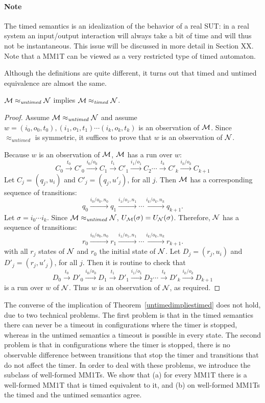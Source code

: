 \paragraph{Note}
The timed semantics is an idealization of the behavior of a real SUT: in a real system an input/output
interaction will always take a bit of time and will thus not be instantaneous.
This issue will be discussed in more detail in Section XX.
Note that a MM1T can be viewed as a very restricted type of timed automaton.

Although the definitions are quite different, it turns out that timed and untimed equivalence are almost the same.

\begin{theorem}
\label{untimedimpliestimed}
${\cal M} \approx_{\mathit{untimed}} {\cal N}$
implies
${\cal M} \approx_{\mathit{timed}} {\cal N}$.
\end{theorem}
\begin{proof}
Assume ${\cal M} \approx_{\mathit{untimed}} {\cal N}$ and assume
$w = (i_0, o_0, t_0), (i_1, o_1, t_1) \cdots (i_k, o_k, t_k)$ is an observation of ${\cal M}$.
Since $\approx_{\mathit{untimed}}$ is symmetric, it suffices to prove that $w$ is an observation of ${\cal N}$.

Because $w$ is an observation of ${\cal M}$, ${\cal M}$ has a run over $w$:
\[
C_0 \xrightarrow{t_0} C'_0 \xrightarrow{i_0/o_0} C_1 \xrightarrow{t_1} C'_1 \xrightarrow{i_1/o_1} C_2 \cdots
\xrightarrow{t_k} C'_k \xrightarrow{i_k/o_k} C_{k+1}
\]
Let $C_j = (q_j, u_i)$ and $C'_j = (q_j, u'_j)$, for all $j$.
Then ${\cal M}$ has a corresponding sequence of transitions:
\[
q_0 \xrightarrow{i_0/o_0, n_0} q_1 \xrightarrow{i_1/o_1, n_1} \cdots \xrightarrow{i_k/o_k, n_k} q_{k+1} .
\]
Let $\sigma = i_0 \cdots i_k$. Since ${\cal M} \approx_{\mathit{untimed}} {\cal N}$, $U_{\cal M} (\sigma) = U_{\cal N} (\sigma)$.
Therefore, ${\cal N}$ has a sequence of transitions:
\[
r_0 \xrightarrow{i_0/o_0, n_0} r_1 \xrightarrow{i_1/o_1, n_1} \cdots \xrightarrow{i_k/o_k, n_k} r_{k+1} .
\]
with all $r_j$ states of ${\cal N}$ and $r_0$ the initial state of ${\cal N}$. 
Let $D_j = (r_j, u_i)$ and $D'_j = (r_j, u'_j)$, for all $j$.
Then it is routine to check that
\[
D_0 \xrightarrow{t_0} D'_0 \xrightarrow{i_0/o_0} D_1 \xrightarrow{t_1} D'_1 \xrightarrow{i_1/o_1} D_2 \cdots
\xrightarrow{t_k} D'_k \xrightarrow{i_k/o_k} D_{k+1}
\]
is a run over $w$ of ${\cal N}$.
Thus $w$ is an observation of ${\cal N}$, as required.
\end{proof}

The converse of the implication of Theorem~\ref{untimedimpliestimed} does not hold, due to two technical problems.
The first problem is that in the timed semantics there can never be a timeout
in configurations where the timer is stopped, whereas in the untimed semantics a timeout is possible in every state.
The second problem is that in configurations where the timer is stopped, there is no observable difference between transitions that stop the timer and transitions that do not affect the timer.
In order to deal with these problems, we introduce the subclass of well-formed MM1Ts.
We show that
(a) for every MM1T there is a well-formed MM1T that is timed equivalent to it, and
(b) on well-formed MM1Ts the timed and the untimed semantics agree.

